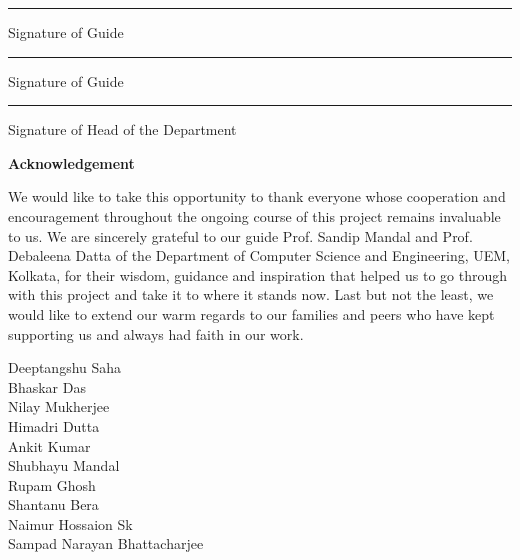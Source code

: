\documentclass[a4paper]{article}
\begin{document}
\vspace{5cm}
\begin{flushleft}
   \rule{4cm}{0.15mm}
   \par Signature of Guide
   
   \begin{flushright}
   \vspace{-1.2cm}
   \rule{4cm}{0.15mm}
   \par Signature of Guide
   \end{flushright}
   \vspace{3cm}
   \rule{4cm}{0.15mm}
   \par Signature of Head of the Department
\end{flushleft}
\clearpage
\begin{center}
    \textbf{Acknowledgement}
    \vspace{3cm}
    \par We would like to take this opportunity to thank everyone whose cooperation and encouragement throughout the ongoing course of this project remains invaluable to us.
We are sincerely grateful to our guide Prof. Sandip Mandal and Prof. Debaleena Datta  of the Department of Computer Science and Engineering, UEM, Kolkata, for their wisdom, guidance and inspiration that helped us to go through with this project and take it to where it stands now.
Last but not the least, we would like to extend our warm regards to our families and peers who have kept supporting us and always had faith in our work.
\end{center}
\vspace{3cm}
\begin{flushright}
Deeptangshu Saha\\
 
Bhaskar Das\\
 
Nilay Mukherjee\\
 
Himadri Dutta\\
 
Ankit Kumar\\
 
Shubhayu Mandal\\
 
Rupam Ghosh\\
 
Shantanu Bera\\
 
Naimur Hossaion Sk\\
 
Sampad Narayan Bhattacharjee\\
\end{flushright}
\clearpage
\tableofcontents
\clearpage
\pagestyle{fancy}
\fancyhf{}
\end{document}
